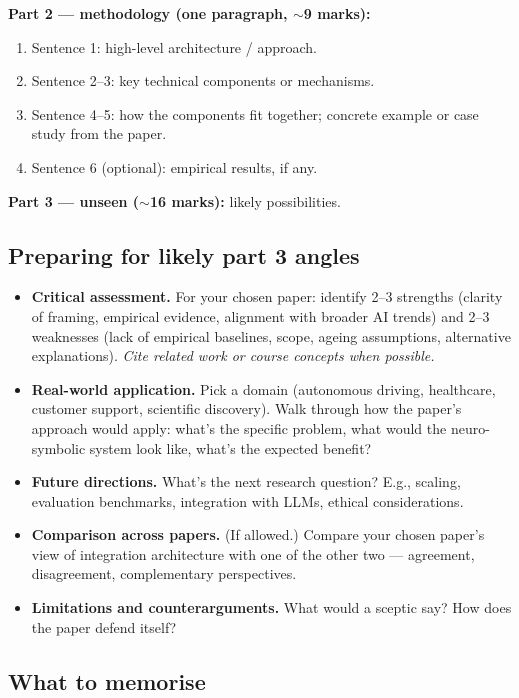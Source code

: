 \documentclass[11pt, a4paper]{article}
\begin{document}
\textbf{Part 2 — methodology (one paragraph, $\sim$9 marks):}
\begin{enumerate}[itemsep=0pt, topsep=0pt]
  \item Sentence 1: high-level architecture / approach.
  \item Sentence 2--3: key technical components or mechanisms.
  \item Sentence 4--5: how the components fit together; concrete example or case study from the paper.
  \item Sentence 6 (optional): empirical results, if any.
\end{enumerate}

\textbf{Part 3 — unseen ($\sim$16 marks):} likely possibilities.

\subsection{Preparing for likely part 3 angles}

\begin{itemize}
  \item \textbf{Critical assessment.} For your chosen paper: identify 2--3 strengths (clarity of framing, empirical evidence, alignment with broader AI trends) and 2--3 weaknesses (lack of empirical baselines, scope, ageing assumptions, alternative explanations). \emph{Cite related work or course concepts when possible.}
  \item \textbf{Real-world application.} Pick a domain (autonomous driving, healthcare, customer support, scientific discovery). Walk through how the paper's approach would apply: what's the specific problem, what would the neuro-symbolic system look like, what's the expected benefit?
  \item \textbf{Future directions.} What's the next research question? E.g., scaling, evaluation benchmarks, integration with LLMs, ethical considerations.
  \item \textbf{Comparison across papers.} (If allowed.) Compare your chosen paper's view of integration architecture with one of the other two — agreement, disagreement, complementary perspectives.
  \item \textbf{Limitations and counterarguments.} What would a sceptic say? How does the paper defend itself?
\end{itemize}

\subsection{What to memorise}
\end{document}
